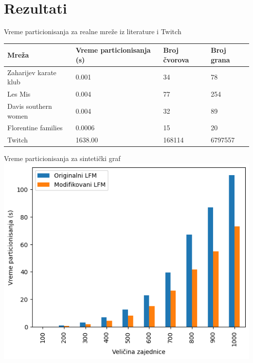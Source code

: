 \documentclass{beamer}
\begin{document}
\section{Rezultati}
\begin{frame}{Vreme particionisanja za realne mreže iz literature i Twitch}
    \centering
    \begin{table}
        \label{tab:4.2}
        \begin{tabular}{p{1.4in}p{1in}p{0.5in}p{0.5in}}
        Mreža & Vreme particionisanja (s)& Broj čvorova & Broj grana \\
        \hline
        Zaharijev karate klub & 0.001 & 34 & 78 \\
        Les Mis & 0.004 & 77 & 254 \\
        Davis southern women & 0.004 & 32 & 89 \\
        Florentine families & 0.0006 & 15 & 20 \\
        Twitch  & 1638.00 & 168114 & 6797557 \\
    \end{tabular}
\end{table}
\end{frame}
    
\begin{frame}{Vreme particionisanja za sintetički graf}
    \centering
    \includegraphics[height=0.8\textheight]{csv/4.3.png}
\end{frame}
\end{document}
